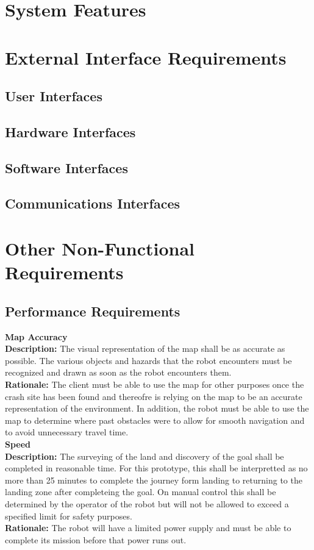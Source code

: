 \documentclass[10pt,a4paper,titlepage]{article}
\begin{document}
	\section{System Features}

	\section{External Interface Requirements}
	\subsection{User Interfaces}
	\subsection{Hardware Interfaces}
	\subsection{Software Interfaces}
	\subsection{Communications Interfaces}

	\section{Other Non-Functional Requirements}
	\subsection{Performance Requirements}
		
		\textbf {Map Accuracy}\\
		\textbf {Description:} The visual representation of the map shall be as accurate as possible. The various objects and hazards that the robot encounters must be recognized and drawn as soon as the robot encounters them.\\
		\textbf {Rationale:} The client must be able to use the map for other purposes once the crash site has been found and thereofre is relying on the map to be an accurate representation of the environment. In addition, the robot must be able to use the map to determine where past obstacles were to allow for smooth navigation and to avoid unnecessary travel time.\\

		\textbf {Speed}\\
		\textbf {Description:} The surveying of the land and discovery of the goal shall be completed in reasonable time. For this prototype, this shall be interpretted as no more than 25 minutes to complete the journey form landing to returning to the landing zone after completeing the goal. On manual control this shall be determined by the operator of the robot but will not be allowed to exceed a specified limit for safety purposes.\\
		\textbf {Rationale:} The robot will have a limited power supply and must be able to complete its mission before that power runs out. \\
		
\end{document}
